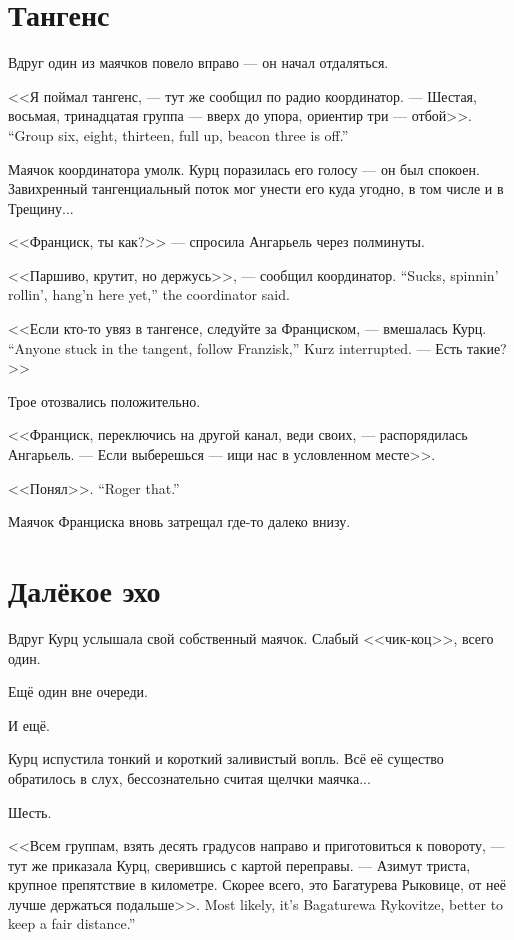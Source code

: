 \section{Тангенс}

Вдруг один из маячков повело вправо --- он начал отдаляться.

<<Я поймал тангенс, --- тут же сообщил по радио координатор.
{--- Шестая, восьмая, тринадцатая группа --- вверх до упора, ориентир три --- отбой>>.}
{``Group six, eight, thirteen, full up, beacon three is off.''}

Маячок координатора умолк.
Курц поразилась его голосу --- он был спокоен.
Завихренный тангенциальный поток мог унести его куда угодно, в том числе и в Трещину...

<<Франциск, ты как?>> --- спросила Ангарьель через полминуты.

{<<Паршиво, крутит, но держусь>>, --- сообщил координатор.}
{``Sucks, spinnin' rollin', hang'n here yet,'' the coordinator said.}

{<<Если кто-то увяз в тангенсе, следуйте за Франциском, --- вмешалась Курц.}
{``Anyone stuck in the tangent, follow Franzisk,'' Kurz interrupted.}
--- Есть такие?>>

Трое отозвались положительно.

<<Франциск, переключись на другой канал, веди своих, --- распорядилась Ангарьель.
--- Если выберешься --- ищи нас в условленном месте>>.

{<<Понял>>.}
{``Roger that.''}

Маячок Франциска вновь затрещал где-то далеко внизу.

\section{Далёкое эхо}

Вдруг Курц услышала свой собственный маячок.
Слабый <<чик-коц>>, всего один.

Ещё один вне очереди.

И ещё.

Курц испустила тонкий и короткий заливистый вопль.
Всё её существо обратилось в слух, бессознательно считая щелчки маячка...

Шесть.

<<Всем группам, взять десять градусов направо и приготовиться к повороту, --- тут же приказала Курц, сверившись с картой переправы.
--- Азимут триста, крупное препятствие в километре.
{Скорее всего, это Багатурева Рыковице, от неё лучше держаться подальше>>.}
{Most likely, it's Bagaturewa Rykovitze, better to keep a fair distance.''}

